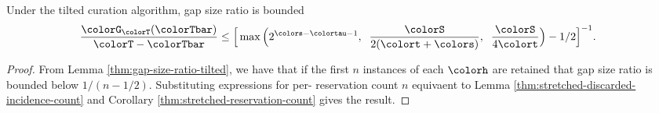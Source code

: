 \begin{theorem}
\label{thm:tilted-gap-size}
Under the tilted curation algorithm, gap size ratio is bounded
\begin{align*}
  \frac{\colorG_{\colorT}(\colorTbar)}{\colorT - \colorTbar}
  &\leq
  \Big[
    \max\Big(
      2^{\colors - \colortau - 1},\;\;
      \frac{\colorS}{2(\colort + \colors)},\;\;
      \frac{\colorS}{4\colort}
    \Big)
    - 1/2
  \Big]^{-1}.
\end{align*}
\end{theorem}
\begin{proof}

From Lemma \ref{thm:gap-size-ratio-tilted}, we have that if the first $n$ instances of each \hv{} $\colorh$ are retained that gap size ratio is bounded below $1/(n - 1/2)$.
Substituting expressions for per-\hv{} reservation count $n$ equivaent to Lemma \ref{thm:stretched-discarded-incidence-count} and Corollary \ref{thm:stretched-reservation-count} gives the result.
\end{proof}

